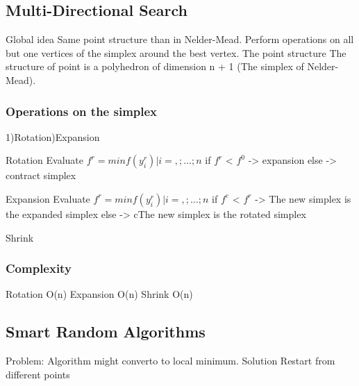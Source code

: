 \subsection{Multi-Directional Search}
Global idea\newline
Same point structure than in Nelder-Mead.\newline
Perform operations on all but one vertices of the simplex around
the best vertex.\newline
The point structure\newline
\newline
The structure of point is a polyhedron of dimension n + 1 (The
simplex of Nelder-Mead).\newline

\subsubsection{Operations on the simplex}
1)Rotation)Expansion\newline

Rotation\newline
Evaluate $f^r = min{f(y^r_i)|i=,;...;n}$\newline
if $f^r$ < $f^0$ -> expansion\newline
else -> contract simplex \newline

Expansion\newline
Evaluate $f^r = min{f(y^r_i)|i=,;...;n}$\newline
if $f^e$ < $f^r$ -> The new simplex is the expanded simplex\newline
else -> cThe new simplex is the rotated simplex \newline

Shrink\newline

\subsubsection{Complexity}
Rotation\newline
O(n)\newline
Expansion\newline
O(n)\newline
Shrink\newline
O(n)

\subsection{Smart Random Algorithms}
Problem:\newline
Algorithm might converto to local minimum.\newline
Solution\newline
Restart from different points\newline


